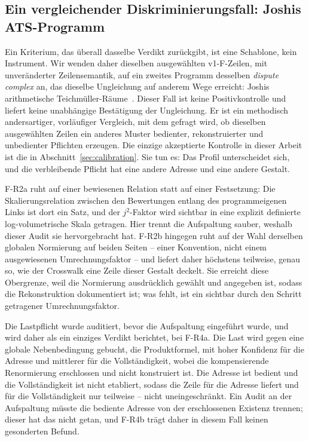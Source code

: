 \documentclass[11pt,a4paper]{article}
\begin{document}
\subsection{Ein vergleichender Diskriminierungsfall: Joshis
ATS-Programm}\label{sec:abc-control}

Ein Kriterium, das überall dasselbe Verdikt zurückgibt, ist eine Schablone,
kein Instrument. Wir wenden daher dieselben ausgewählten v1-F-Zeilen, mit
unveränderter Zeilensemantik, auf ein zweites Programm desselben
\emph{dispute complex} an, das dieselbe Ungleichung auf anderem Wege
erreicht: Joshis arithmetische
Teichmüller-Räume~\cite{JoshiATSIII,JoshiATSIV}. Dieser Fall ist keine
Positivkontrolle und liefert keine unabhängige Bestätigung der Ungleichung.
Er ist ein methodisch andersartiger, vorläufiger Vergleich, mit dem gefragt
wird, ob dieselben ausgewählten Zeilen ein anderes Muster bedienter,
rekonstruierter und unbedienter Pflichten erzeugen. Die einzige akzeptierte
Kontrolle in dieser Arbeit ist die in
Abschnitt~\ref{sec:calibration}. Sie tun es: Das Profil unterscheidet sich,
und die verbleibende Pflicht hat eine andere Adresse und eine andere Gestalt.

F-R2a ruht auf einer bewiesenen Relation statt auf einer Festsetzung: Die
Skalierungsrelation zwischen den Bewertungen entlang des programmeigenen
Links ist dort ein Satz, und der $j^2$-Faktor wird sichtbar in eine explizit
definierte log-volumetrische Skala getragen. Hier trennt die Aufspaltung
sauber, weshalb dieser Audit sie hervorgebracht hat. F-R2b hingegen ruht auf
der Wahl derselben globalen Normierung auf beiden Seiten -- einer
Konvention, nicht einem ausgewiesenen Umrechnungsfaktor -- und liefert daher
höchstens teilweise, genau so, wie der Crosswalk eine Zeile dieser Gestalt
deckelt. Sie erreicht diese Obergrenze, weil die Normierung ausdrücklich
gewählt und angegeben ist, sodass die Rekonstruktion dokumentiert ist; was
fehlt, ist ein sichtbar durch den Schritt getragener Umrechnungsfaktor.

Die Lastpflicht wurde auditiert, bevor die Aufspaltung eingeführt wurde, und
wird daher als ein einziges Verdikt berichtet, bei F-R4a. Die Last wird gegen
eine globale Nebenbedingung gebucht, die Produktformel, mit hoher Konfidenz
für die Adresse und mittlerer für die Vollständigkeit, wobei die
kompensierende Renormierung erschlossen und nicht konstruiert ist. Die
Adresse ist bedient und die Vollständigkeit ist nicht etabliert, sodass die
Zeile für die Adresse liefert und für die Vollständigkeit nur teilweise --
nicht uneingeschränkt. Ein Audit an der Aufspaltung müsste die bediente
Adresse von der erschlossenen Existenz trennen; dieser hat das nicht getan,
und F-R4b trägt daher in diesem Fall keinen gesonderten Befund.
\end{document}
